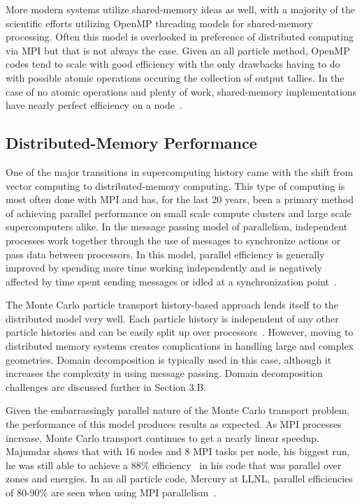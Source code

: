 More modern systems utilize shared-memory ideas as well, with a majority of the scientific efforts utilizing OpenMP threading models for shared-memory processing.
%
Often this model is overlooked in preference of distributed computing via MPI but that is not always the case.
%
Given an all particle method, OpenMP codes tend to scale with good efficiency with the only drawbacks having to do with possible atomic operations occuring the collection of output tallies.
%
In the case of no atomic operations and plenty of work, shared-memory implementations have nearly perfect efficiency on a node~\cite{siegel2014multi}.

\subsection*{ \textbf{Distributed-Memory Performance}}

One of the major transitions in supercomputing history came with the shift from vector computing to distributed-memory computing.
%
This type of computing is most often done with MPI and has, for the last 20 years, been a primary method of achieving parallel performance on small scale compute clusters and large scale supercomputers alike.
%
In the message passing model of parallelism, independent processes work together through the use of messages to synchronize actions or pass data between processors.
%
In this model, parallel efficiency is generally improved by spending more time working independently and is negatively affected by time spent sending messages or idled at a synchronization point~\cite{yanghybrid}.
%

%
The Monte Carlo particle transport history-based approach lends itself to the distributed model very well.
%
Each particle history is independent of any other particle histories and can be easily split up over processors~\cite{yanghybrid}.
%
However, moving to distributed memory systems creates complications in handling large and complex geometries.
%
Domain decomposition is typically used in this case, although it increases the complexity in using message passing.
%
Domain decomposition challenges are discussed further in Section 3.B.
%

%
Given the embarrassingly parallel nature of the Monte Carlo transport problem, the performance of this model produces results as expected.
%
As MPI processes increase, Monte Carlo transport continues to get a nearly linear speedup.
%
Majumdar shows that with 16 nodes and 8 MPI tasks per node, his biggest run, he was still able to achieve a 88\% efficiency~\cite{majumdar2000parallel} in his code that was parallel over zones and energies.
%
In an all particle code, Mercury at LLNL, parallel efficiencies of 80-90\% are seen when using MPI parallelism~\cite{procassini2005load}.

